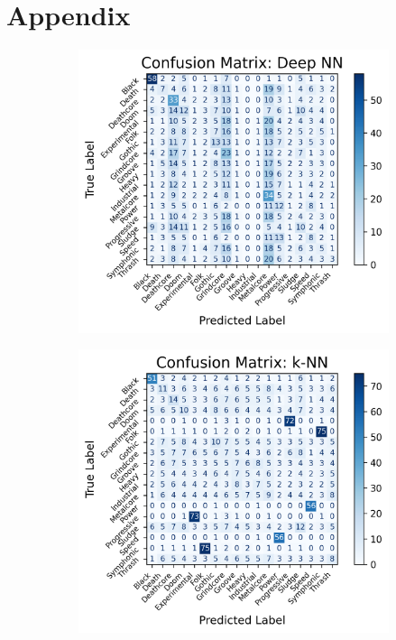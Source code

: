 \section{Appendix}
\begin{figure}[h!]
    \centering
    \begin{subfigure}[b]{0.45\textwidth}
        \centering
        \includegraphics[width=\textwidth]{figures/confusion_matrix_Deep NN.png}
        \label{fig:subfig1}
    \end{subfigure}
    \hfill
    \begin{subfigure}[b]{0.45\textwidth}
        \centering
        \includegraphics[width=\textwidth]{figures/confusion_matrix_k-NN.png}

\end{subfigure}
\end{figure}
